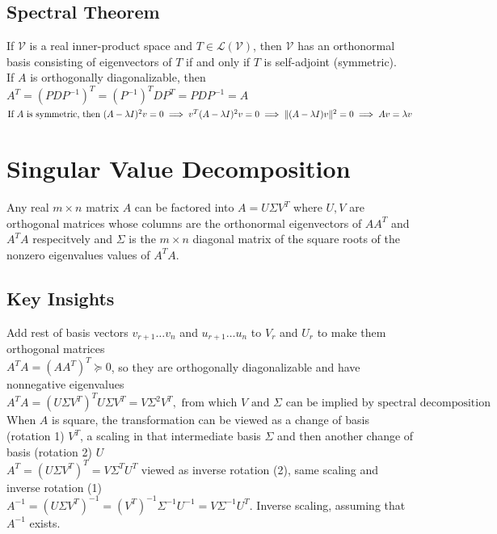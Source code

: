 \documentclass{article}
\DeclarePairedDelimiter\norm{\lVert}{\rVert}%
\newcommand{\linear}{\mathcal{L}}
\newcommand{\V}{\mathcal{V}}
\begin{document}
\subsection{Spectral Theorem}
If $\V$ is a real inner-product space and $T \in \linear(\V)$, then $\V$ has an orthonormal basis consisting of eigenvectors of $T$ if and only if $T$ is self-adjoint (symmetric). \\
If $A$ is orthogonally diagonalizable, then $A^T = (PDP^{-1})^T = (P^{-1})^TDP^T = PDP^{-1} = A$ \\
${\mbox{If } A \mbox { is symmetric, then } (A-\lambda I)^2v = 0 \implies v^T(A-\lambda I)^2v = 0 \implies \norm{(A-\lambda I)v}^2 = 0 \implies Av = \lambda v}$

\section{Singular Value Decomposition}
Any real $m \times n$ matrix $A$ can be factored into $A = U \Sigma V^T$ where $U, V$ are orthogonal matrices whose columns are the orthonormal eigenvectors of $AA^T$ and $A^TA$ respecitvely and $\Sigma$ is the $m \times n$ diagonal matrix of the square roots of the nonzero eigenvalues values of $A^TA$.
\subsection{Key Insights}
Add rest of basis vectors $v_{r+1} \ldots v_n$ and $u_{r+1} \ldots u_n$ to $V_r$ and $U_r$ to make them orthogonal matrices \\
$A^TA = (AA^T)^T \succeq 0$, so they are orthogonally diagonalizable and have nonnegative eigenvalues \\
$A^TA = (U \Sigma V^T)^T U \Sigma V^T = V \Sigma^2 V^T, \mbox{ from which } V \mbox{ and } \Sigma \mbox{ can be implied by spectral decomposition}$ \\
When $A$ is square, the transformation can be viewed as a change of basis (rotation 1) $V^T$, a scaling in that intermediate basis $\Sigma$ and then another change of basis (rotation 2) $U$ \\
$A^T = (U \Sigma V^T)^T = V \Sigma^T U^T$ viewed as inverse rotation (2), same scaling and inverse rotation (1) \\
$A^{-1} = (U \Sigma V^T)^{-1} = (V^T)^{-1} \Sigma^{-1} U^{-1} = V \Sigma^{-1} U^T$. Inverse scaling, assuming that $A^{-1}$ exists.
\end{document}
